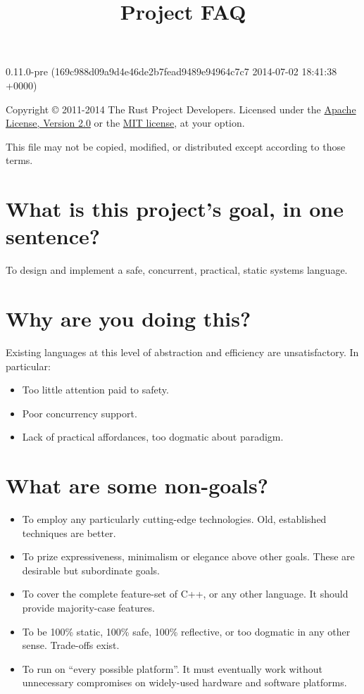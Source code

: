 \documentclass[]{article}
\title{Project FAQ}
\begin{document}
\maketitle

0.11.0-pre (169c988d09a9d4e46de2b7fead9489e94964c7c7 2014-07-02 18:41:38 +0000)

Copyright © 2011-2014 The Rust Project Developers. Licensed under the
\href{http://www.apache.org/licenses/LICENSE-2.0}{Apache License,
Version 2.0} or the \href{http://opensource.org/licenses/MIT}{MIT
license}, at your option.

This file may not be copied, modified, or distributed except according
to those terms.

{
\hypersetup{linkcolor=black}
\setcounter{tocdepth}{3}
\tableofcontents
}
\section{What is this project's goal, in one
sentence?}\label{what-is-this-projects-goal-in-one-sentence}

To design and implement a safe, concurrent, practical, static systems
language.

\section{Why are you doing this?}\label{why-are-you-doing-this}

Existing languages at this level of abstraction and efficiency are
unsatisfactory. In particular:

\begin{itemize}
\itemsep1pt\parskip0pt
\item
  Too little attention paid to safety.
\item
  Poor concurrency support.
\item
  Lack of practical affordances, too dogmatic about paradigm.
\end{itemize}

\section{What are some non-goals?}\label{what-are-some-non-goals}

\begin{itemize}
\itemsep1pt\parskip0pt
\item
  To employ any particularly cutting-edge technologies. Old, established
  techniques are better.
\item
  To prize expressiveness, minimalism or elegance above other goals.
  These are desirable but subordinate goals.
\item
  To cover the complete feature-set of C++, or any other language. It
  should provide majority-case features.
\item
  To be 100\% static, 100\% safe, 100\% reflective, or too dogmatic in
  any other sense. Trade-offs exist.
\item
  To run on ``every possible platform''. It must eventually work without
  unnecessary compromises on widely-used hardware and software
  platforms.
\end{itemize}
\end{document}
